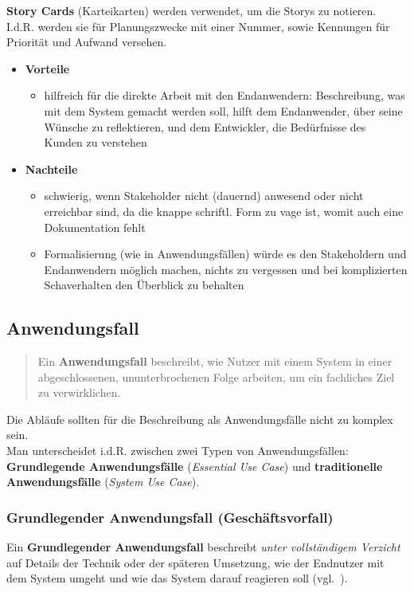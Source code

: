 \noindent
\textbf{Story Cards} (Karteikarten) werden verwendet, um die Storys zu notieren.\\
I.d.R. werden sie für Planungszwecke mit einer Nummer, sowie Kennungen für Priorität und Aufwand versehen.


\begin{itemize}
    \item \textbf{Vorteile}
        \begin{itemize}
            \item hilfreich für die direkte Arbeit mit den Endanwendern: Beschreibung, was mit dem System gemacht werden soll, hilft dem Endanwender, über seine Wünsche zu reflektieren, und dem Entwickler, die Bedürfnisse des Kunden zu verstehen
        \end{itemize}
    \item \textbf{Nachteile}
        \begin{itemize}
            \item schwierig, wenn Stakeholder nicht (dauernd) anwesend oder nicht erreichbar sind, da die knappe schriftl. Form zu vage ist, womit auch eine Dokumentation fehlt
            \item Formalisierung (wie in Anwendungsfällen) würde es den Stakeholdern und Endanwendern möglich machen, nichts zu vergessen und bei komplizierten Schaverhalten den Überblick zu behalten
        \end{itemize}
\end{itemize}

\subsection{Anwendungsfall}
\blockquote[{\cite[67, Hervorhebung eigene]{Wed09}}]{Ein \textbf{Anwendungsfall} beschreibt, wie Nutzer mit einem System in einer abgeschlossenen, ununterbrochenen Folge arbeiten, um ein fachliches Ziel zu verwirklichen.}

\noindent
Die Abläufe sollten für die Beschreibung als Anwendungsfälle nicht zu komplex sein.\\

\noindent
Man unterscheidet i.d.R. zwischen zwei Typen von Anwendungsfällen: \textbf{Grundlegende Anwendungsfälle} (\textit{Essential Use Case}) und \textbf{traditionelle Anwendungsfälle} (\textit{System Use Case}).

\subsubsection*{Grundlegender Anwendungsfall (Geschäftsvorfall)}
Ein \textbf{Grundlegender Anwendungsfall} beschreibt \textit{unter vollständigem Verzicht} auf Details der Technik oder der späteren Umsetzung, wie der Endnutzer mit dem System umgeht und wie das System darauf reagieren soll (vgl.~\cite[68]{Wed09}).\\

